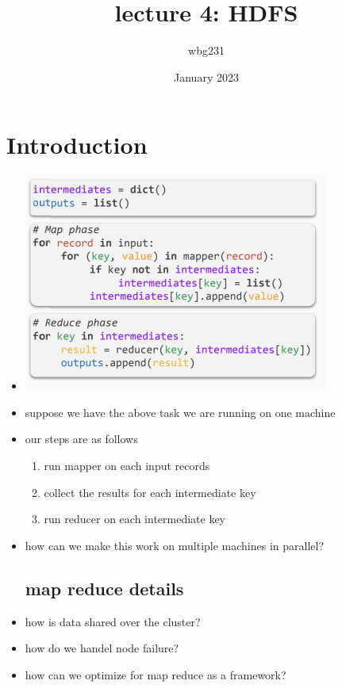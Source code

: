 \documentclass{article}
\title{lecture 4: HDFS }
\author{wbg231 }
\date{January 2023}
\begin{document}
\maketitle

\section{Introduction}
\begin{itemize}
\item \includegraphics*[width=10cm]{images/Screenshot 2023-05-09 at 3.49.43 PM.png}
\item suppose we have the above task we are running on one machine 
\item our steps are as follows
\begin{enumerate}
    \item run mapper on each input records
    \item collect the results for each intermediate key
    \item run reducer on each intermediate key
\end{enumerate}
\item how can we make this work on multiple machines in parallel?
\subsection*{map reduce details}
\item how is data shared over the cluster? 
\item how do we handel node failure?
\item how can we optimize for map reduce as a framework?

\end{itemize}
\end{document}
